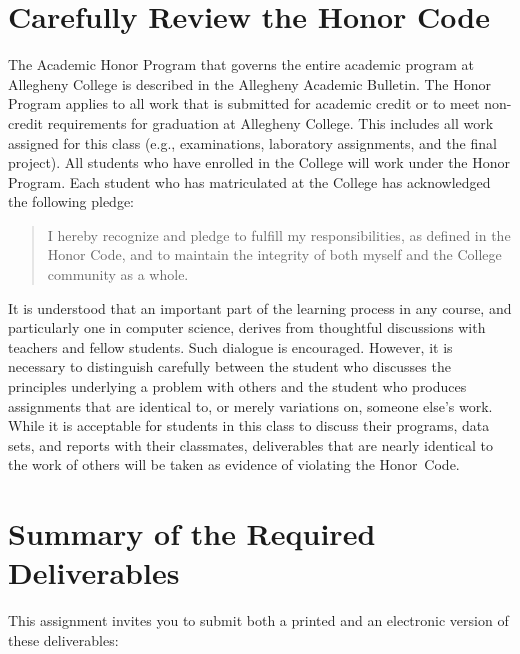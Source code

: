 \section*{Carefully Review the Honor Code}

The Academic Honor Program that governs the entire academic program at Allegheny College is described in the Allegheny
Academic Bulletin.  The Honor Program applies to all work that is submitted for academic credit or to meet non-credit
requirements for graduation at Allegheny College.  This includes all work assigned for this class (e.g., examinations,
  laboratory assignments, and the final project).  All students who have enrolled in the College will work under the Honor
Program.  Each student who has matriculated at the College has acknowledged the following pledge:

\vspace*{-.05in}
\begin{quote}
  I hereby recognize and pledge to fulfill my responsibilities, as defined in the Honor Code, and to maintain the
  integrity of both myself and the College community as a whole.
\end{quote}
\vspace*{-.05in}

\noindent It is understood that an important part of the learning process in any course, and particularly one in
computer science, derives from thoughtful discussions with teachers and fellow students.  Such dialogue is encouraged.
However, it is necessary to distinguish carefully between the student who discusses the principles underlying a problem
with others and the student who produces assignments that are identical to, or merely variations on, someone else's
work.  While it is acceptable for students in this class to discuss their programs, data sets, and reports with their
classmates, deliverables that are nearly identical to the work of others will be taken as evidence of violating the
\mbox{Honor Code}.

\section*{Summary of the Required Deliverables}

This assignment invites you to submit both a printed and an electronic version of these deliverables:

